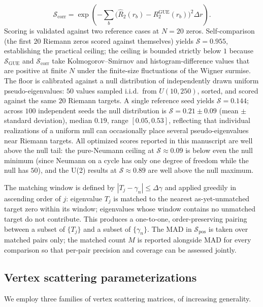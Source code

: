 \documentclass[cntp]{ipart}
\theoremstyle{plain}
\theoremstyle{remark}
\begin{document}
\begin{equation}
    \mathcal{S}_{\mathrm{corr}} = \exp\!\left(-\sum_b \bigl(\hat{R}_2(r_b) - R_2^{\mathrm{GUE}}(r_b)\bigr)^2 \Delta r\right).
\end{equation}
Scoring is validated against two reference cases at $N = 20$ zeros. Self-comparison (the first $20$ Riemann zeros scored against themselves) yields $\mathcal{S} = 0.955$, establishing the practical ceiling; the ceiling is bounded strictly below $1$ because $\mathcal{S}_{\mathrm{GUE}}$ and $\mathcal{S}_{\mathrm{corr}}$ take Kolmogorov--Smirnov and histogram-difference values that are positive at finite $N$ under the finite-size fluctuations of the Wigner surmise. The floor is calibrated against a null distribution of independently drawn uniform pseudo-eigenvalues: $50$ values sampled i.i.d.\ from $U(10, 250)$, sorted, and scored against the same $20$ Riemann targets. A single reference seed yields $\mathcal{S} = 0.144$; across $100$ independent seeds the null distribution is $\mathcal{S} = 0.21 \pm 0.09$ (mean $\pm$ standard deviation), median $0.19$, range $[0.05, 0.53]$, reflecting that individual realizations of a uniform null can occasionally place several pseudo-eigenvalues near Riemann targets. All optimized scores reported in this manuscript are well above the null tail: the pure-Neumann ceiling at $\mathcal{S} \approx 0.09$ is below even the null minimum (since Neumann on a cycle has only one degree of freedom while the null has $50$), and the U(2) results at $\mathcal{S} \approx 0.89$ are well above the null maximum.

The matching window is defined by $|T_j - \gamma_n| \leq \Delta\gamma$ and applied greedily in ascending order of $j$: eigenvalue $T_j$ is matched to the nearest as-yet-unmatched target zero within its window; eigenvalues whose window contains no unmatched target do not contribute. This produces a one-to-one, order-preserving pairing between a subset of $\{T_j\}$ and a subset of $\{\gamma_n\}$. The MAD in $\mathcal{S}_{\mathrm{pos}}$ is taken over matched pairs only; the matched count $M$ is reported alongside MAD for every comparison so that per-pair precision and coverage can be assessed jointly.

\subsection{Vertex scattering parameterizations}
\label{sec:methods-scattering}

We employ three families of vertex scattering matrices, of increasing generality.
\end{document}

